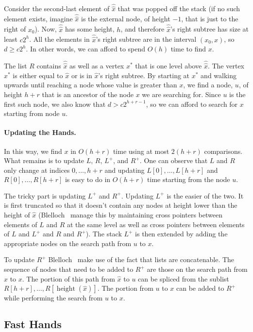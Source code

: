 \documentclass{patmorin}
\DeclareMathOperator{\hgt}{height}
\begin{document}
Consider the second-last element of $\hat{\hat x}$ that was popped
off the stack (if no such element exists, imagine $\hat{\hat x}$ is
the external node, of height $-1$, that is just to the right of $x_0$).
Now, $\hat{\hat x}$ has some height, $h$, and therefore $\hat{\hat x}$'s
right subtree has size at least $c2^h$.  All the elements in $\hat{\hat
x}$'s right subtree are in the interval $(x_0,x)$, so $d\ge c2^h$.
In other words, we can afford to spend $O(h)$ time to find $x$.

The list $R$ contains $\hat{\hat x}$ as well as a vertex $x^*$ that is one
level above $\hat{\hat x}$.  The vertex $x^*$ is either equal to $\hat
x$ or is in $\hat x$'s right subtree.  By starting at $x^*$ and walking
upwards until reaching a node whose value is greater than $x$, we find
a node, $u$, of height $h+r$ that is an ancestor of the node $x$ we are
searching for.  Since $u$ is the first such node, we also know that $d >
c2^{h+r-1}$, so we can afford to search for $x$ starting from node $u$.

\paragraph{Updating the Hands.}
In this way, we find $x$ in $O(h+r)$ time using at most $2(h+r)$
comparisons.  What remains is to update $L$, $R$, $L^+$, and $R^+$.
One can observe that $L$ and $R$ only change at indices $0,\ldots,h+r$
and updating $L[0],\ldots,L[h+r]$ and $R[0],\ldots,R[h+r]$ is easy to
do in $O(h+r)$ time starting from the node $u$.

The tricky part is updating $L^+$ and $R^+$.  Updating $L^+$ is the
easier of the two.  It is first truncated so that it doesn't contain
any nodes at height lower than the height of $\hat x$ (Blelloch \etal\
manage this by maintaining cross pointers between elements of $L$ and
$R$ at the same level as well as cross pointers between elements of $L$
and $L^+$ and $R$ and $R^+$). The stack $L^+$ is then extended by adding
the appropriate nodes on the search path from $u$ to $x$.

To update $R^+$ Blelloch \etal\ make use of the fact that lists are
concatenable. The sequence of nodes that need to be added to $R^+$
are those on the search path from $\hat x$ to $x$.  The portion
of this path from $\hat x$ to $u$ can be spliced from the sublist
$R[h+r],\ldots,R[\hgt(\hat{x})]$. The portion from $u$ to $x$ can be
added to $R^+$ while performing the search from $u$ to $x$.

\subsection{Fast Hands}
\end{document}
